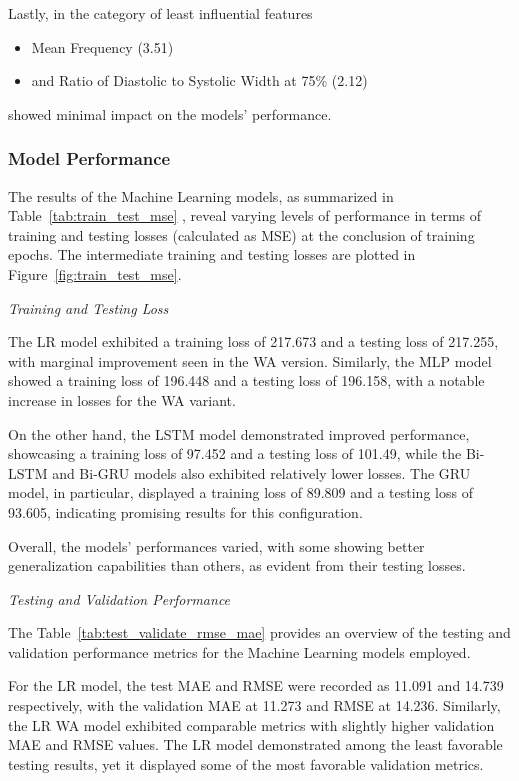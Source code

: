 Lastly, in the category of least influential features
\begin{itemize}[itemsep=2pt]
    \item Mean Frequency (3.51)
    \item and Ratio of Diastolic to Systolic Width at 75\% (2.12)
\end{itemize}
showed minimal impact on the models' performance.

\subsubsection{Model Performance}
\label{subsubsec:model_performance}

The results of the Machine Learning models, as summarized in Table~\ref{tab:train_test_mse} , reveal varying levels of performance in terms of training and testing losses (calculated as MSE) at the conclusion of training epochs.
The intermediate training and testing losses are plotted in Figure~\ref{fig:train_test_mse}.

\vspace{0.2cm}
\textit{Training and Testing Loss}
\vspace{0.2cm}

The LR model exhibited a training loss of 217.673 and a testing loss of 217.255, with marginal improvement seen in the WA version.
Similarly, the MLP model showed a training loss of 196.448 and a testing loss of 196.158, with a notable increase in losses for the WA variant.

On the other hand, the LSTM model demonstrated improved performance, showcasing a training loss of 97.452 and a testing loss of 101.49, while the Bi-LSTM and Bi-GRU models also exhibited relatively lower losses.
The GRU model, in particular, displayed a training loss of 89.809 and a testing loss of 93.605, indicating promising results for this configuration.

Overall, the models' performances varied, with some showing better generalization capabilities than others, as evident from their testing losses.

\vspace{0.2cm}
\textit{Testing and Validation Performance}
\vspace{0.2cm}

The Table~\ref{tab:test_validate_rmse_mae} provides an overview of the testing and validation performance metrics for the Machine Learning models employed.

For the LR model, the test MAE and RMSE were recorded as 11.091 and 14.739 respectively, with the validation MAE at 11.273 and RMSE at 14.236.
Similarly, the LR WA model exhibited comparable metrics with slightly higher validation MAE and RMSE values.
The LR model demonstrated among the least favorable testing results, yet it displayed some of the most favorable validation metrics.

